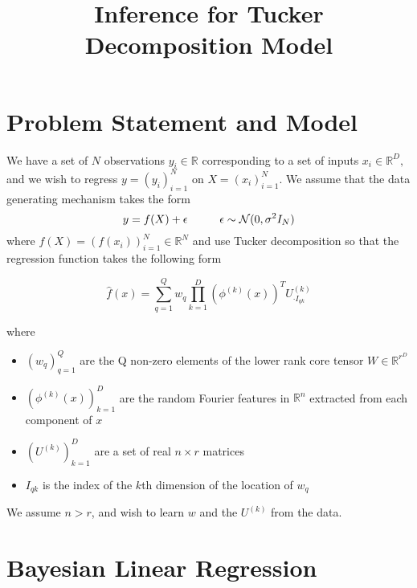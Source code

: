 \documentclass[a4paper,10pt]{article}
\title{Inference for Tucker Decomposition Model}
\begin{document}
\maketitle

\section{Problem Statement and Model}

We have a set of $N$ observations $y_i \in \mathbb{R}$ corresponding to a set of inputs $x_i \in \mathbb{R}^D, $ and we wish to regress $y=(y_i)_{i=1}^{N}$ on $X=(x_i)_{i=1}^{N}$. We assume that the data generating mechanism takes the form
\begin{equation}
y=f(X) + \epsilon \hspace{10 mm} \epsilon \sim \mathcal{N}(0,\sigma^2 I_N)
\end{equation}
where $f(X)=(f(x_i))_{i=1}^{N} \in \mathbb{R}^N$ and use Tucker decomposition so that the regression function takes the following form

\begin{equation}
\hat{f}(x)=\sum_{q=1}^Q w_q \prod_{k=1}^D (\phi^{(k)}(x))^T U^{(k)}_{\cdot I_{qk}}
\end{equation}

where 
\begin{itemize}
\item $(w_q)_{q=1}^Q$ are the Q non-zero elements of the lower rank core tensor $W \in \mathbb{R}^{r^D}$
\item $(\phi^{(k)}(x))_{k=1}^D $ are the random Fourier features in $\mathbb{R}^n$ extracted from each component of $x$
\item $(U^{(k)})_{k=1}^D$ are a set of real $n \times r$ matrices
\item $I_{qk}$ is the index of the $k$th dimension of the location of $w_q$
\end{itemize}
We assume $n>r$, and wish to learn $w$ and the $U^{(k)}$ from the data. 

\section{Bayesian Linear Regression}
\end{document}
